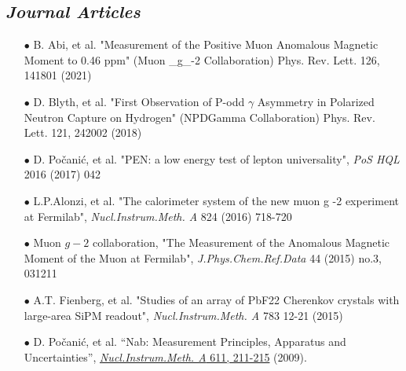 \documentclass{article}[10pt]
\begin{document}
\subsection*{\emph{Journal Articles}}
\begin{itemize}
\item [$\bullet$] B. Abi, et al. "Measurement of the Positive Muon Anomalous Magnetic Moment to 0.46 ppm" (Muon _g_-2 Collaboration) Phys. Rev. Lett. 126, 141801 (2021)
\item [$\bullet$] D. Blyth, et al. "First Observation of P-odd $\gamma$ Asymmetry in Polarized Neutron Capture on Hydrogen" (NPDGamma Collaboration) Phys. Rev. Lett. 121, 242002 (2018)
\item [$\bullet$] D. Po\v{c}ani\'c, et al. "PEN: a low energy test of lepton universality", \emph{PoS HQL} 2016 (2017) 042
\item [$\bullet$] L.P.Alonzi, et al. "The calorimeter system of the new muon g -2 experiment at Fermilab", \emph{Nucl.Instrum.Meth. A} 824 (2016) 718-720
\item [$\bullet$] Muon $g-2$ collaboration, "The Measurement of the Anomalous Magnetic Moment of the Muon at Fermilab", \emph{J.Phys.Chem.Ref.Data} 44 (2015) no.3, 031211
\item [$\bullet$] A.T. Fienberg, et al. "Studies of an array of PbF22 Cherenkov crystals with large-area SiPM readout", \emph{Nucl.Instrum.Meth. A} 783 12-21 (2015)
\item [$\bullet$] D. Po\v{c}ani\'c, et al. ``Nab: Measurement Principles, Apparatus and Uncertainties'', \href{http://www.sciencedirect.com/science?_ob=ArticleURL&_udi=B6TJM-4WY6JS6-B&_user=709071&_coverDate=12/11/2009&_rdoc=1&_fmt=high&_orig=search&_origin=search&_sort=d&_docanchor=&view=c&_searchStrId=1563612201&_rerunOrigin=google&_acct=C000039638&_version=1&_urlVersion=0&_userid=709071&md5=602265f8ed1e05dbcd605115545a0871&searchtype=a}{\emph{Nucl.Instrum.Meth. A} 611, 211-215} (2009).
\end{itemize}


\end{document}
